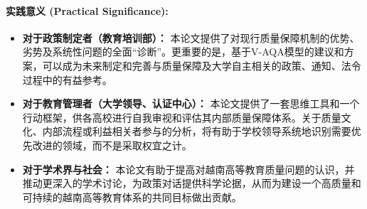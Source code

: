 \paragraph{实践意义 (Practical Significance):}
\begin{itemize}
    \item \textbf{对于政策制定者（教育培训部）：} 本论文提供了对现行质量保障机制的优势、劣势及系统性问题的全面“诊断”。更重要的是，基于V-AQA模型的建议和方案，可以成为未来制定和完善与质量保障及大学自主相关的政策、通知、法令过程中的有益参考。
    \item \textbf{对于教育管理者（大学领导、认证中心）：} 本论文提供了一套思维工具和一个行动框架，供各高校进行自我审视和评估其内部质量保障体系。关于质量文化、内部流程或利益相关者参与的分析，将有助于学校领导系统地识别需要优先改进的领域，而不是采取权宜之计。
    \item \textbf{对于学术界与社会：} 本论文有助于提高对越南高等教育质量问题的认识，并推动更深入的学术讨论，为政策对话提供科学论据，从而为建设一个高质量和可持续的越南高等教育体系的共同目标做出贡献。
\end{itemize}















